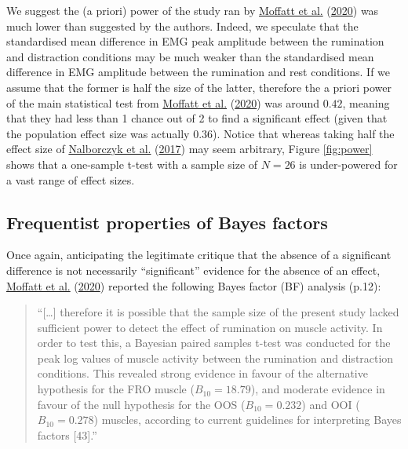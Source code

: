 \documentclass[
  english,
  man, donotrepeattitle,mask,floatsintext]{apa6}
\begin{document}
We suggest the (a priori) power of the study ran by \protect\hyperlink{ref-moffatt_inner_2020}{Moffatt et al.} (\protect\hyperlink{ref-moffatt_inner_2020}{2020}) was much lower than suggested by the authors. Indeed, we speculate that the standardised mean difference in EMG peak amplitude between the rumination and distraction conditions may be much weaker than the standardised mean difference in EMG amplitude between the rumination and rest conditions. If we assume that the former is half the size of the latter, therefore the a priori power of the main statistical test from \protect\hyperlink{ref-moffatt_inner_2020}{Moffatt et al.} (\protect\hyperlink{ref-moffatt_inner_2020}{2020}) was around \(0.42\), meaning that they had less than 1 chance out of 2 to find a significant effect (given that the population effect size was actually \(0.36\)). Notice that whereas taking half the effect size of \protect\hyperlink{ref-nalborczyk_orofacial_2017}{Nalborczyk et al.} (\protect\hyperlink{ref-nalborczyk_orofacial_2017}{2017}) may seem arbitrary, Figure \ref{fig:power} shows that a one-sample t-test with a sample size of \(N = 26\) is under-powered for a vast range of effect sizes.

\hypertarget{frequentist-properties-of-bayes-factors}{%
\subsection{Frequentist properties of Bayes factors}\label{frequentist-properties-of-bayes-factors}}

Once again, anticipating the legitimate critique that the absence of a significant difference is not necessarily ``significant'' evidence for the absence of an effect, \protect\hyperlink{ref-moffatt_inner_2020}{Moffatt et al.} (\protect\hyperlink{ref-moffatt_inner_2020}{2020}) reported the following Bayes factor (BF) analysis (p.12):

\begin{quote}
``{[}\ldots{]} therefore it is possible that the sample size of the present study lacked sufficient power to detect the effect of rumination on muscle activity. In order to test this, a Bayesian paired samples t-test was conducted for the peak log values of muscle activity between the rumination and distraction conditions. This revealed strong evidence in favour of the alternative hypothesis for the FRO muscle (\(B_{10} = 18.79\)), and moderate evidence in favour of the null hypothesis for the OOS (\(B_{10} = 0.232\)) and OOI (\(B_{10} = 0.278\)) muscles, according to current guidelines for interpreting Bayes factors {[}43{]}.''
\end{quote}
\end{document}

